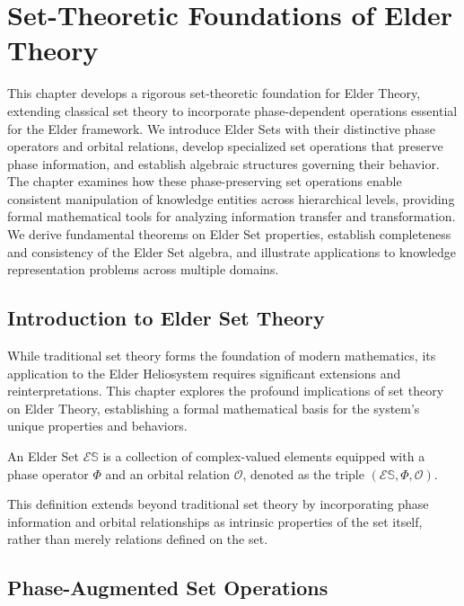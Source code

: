\chapter{Set-Theoretic Foundations of Elder Theory}

\begin{tcolorbox}[colback=DarkSkyBlue!5!white,colframe=DarkSkyBlue!75!black,title=Chapter Summary]
This chapter develops a rigorous set-theoretic foundation for Elder Theory, extending classical set theory to incorporate phase-dependent operations essential for the Elder framework. We introduce Elder Sets with their distinctive phase operators and orbital relations, develop specialized set operations that preserve phase information, and establish algebraic structures governing their behavior. The chapter examines how these phase-preserving set operations enable consistent manipulation of knowledge entities across hierarchical levels, providing formal mathematical tools for analyzing information transfer and transformation. We derive fundamental theorems on Elder Set properties, establish completeness and consistency of the Elder Set algebra, and illustrate applications to knowledge representation problems across multiple domains.
\end{tcolorbox}

\section{Introduction to Elder Set Theory}

While traditional set theory forms the foundation of modern mathematics, its application to the Elder Heliosystem requires significant extensions and reinterpretations. This chapter explores the profound implications of set theory on Elder Theory, establishing a formal mathematical basis for the system's unique properties and behaviors.

\begin{definition}
An Elder Set $\mathcal{E}\mathbb{S}$ is a collection of complex-valued elements equipped with a phase operator $\Phi$ and an orbital relation $\mathcal{O}$, denoted as the triple $(\mathcal{E}\mathbb{S}, \Phi, \mathcal{O})$.
\end{definition}

This definition extends beyond traditional set theory by incorporating phase information and orbital relationships as intrinsic properties of the set itself, rather than merely relations defined on the set.

\section{Phase-Augmented Set Operations}

